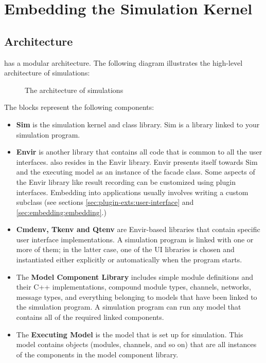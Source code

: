 \chapter{Embedding the Simulation Kernel}
\label{cha:embedding}

\section{Architecture}
\label{sec:embedding:architecture}

{\opp} has a modular architecture. The following diagram illustrates the
high-level architecture of {\opp} simulations:

\begin{figure}[htbp]
  \begin{center}
    
    \caption{The architecture of {\opp} simulations}
  \end{center}
\end{figure}

The blocks represent the following components:

\begin{itemize}
  \item{\textbf{Sim} is the simulation kernel and class
    library. Sim is a library linked to
    your simulation program.}
  \item{\textbf{Envir} is another library that contains all code
    that is common to all the user interfaces.  also resides
    in the Envir library. Envir presents itself towards Sim and the executing model
    as an instance of the  facade class. Some aspects of the
    Envir library like result recording can be customized
    using plugin interfaces. Embedding {\opp} into applications
    usually involves writing a custom  subclass (see sections
    \ref{sec:plugin-exts:user-interface} and \ref{sec:embedding:embedding}.)}
  \item{\textbf{Cmdenv, Tkenv and Qtenv} are Envir-based libraries that contain
    specific user interface implementations. A simulation program
    is linked with one or more of them; in the latter case, one of the UI libraries
    is chosen and instantiated either explicitly or automatically when the program starts.}
  \item{The \textbf{Model Component Library} includes simple module definitions and
    their C++ implementations, compound module types, channels, networks,
    message types, and everything belonging to models that
    have been linked to the simulation program. A simulation program can
    run any model that contains all of the required linked components.}
  \item{The \textbf{Executing Model} is the model that is set up
    for simulation. This model contains objects (modules, channels, and so on) that
    are all instances of the components in the model component library.}
\end{itemize}

